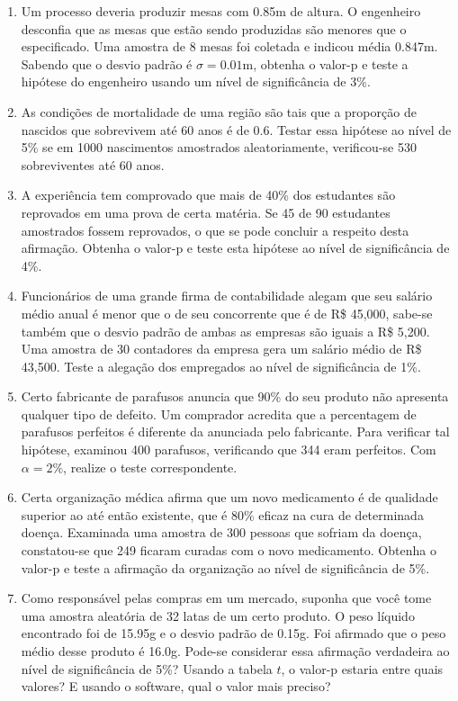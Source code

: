 \documentclass[
]{book}
\theoremstyle{definition}
\theoremstyle{definition}
\theoremstyle{definition}
\theoremstyle{remark}
\begin{document}
\begin{enumerate}
\def\labelenumi{\arabic{enumi}.}
\setcounter{enumi}{1}
\item
  Um processo deveria produzir mesas com 0.85m de altura. O engenheiro desconfia que as mesas que estão sendo produzidas são menores que o especificado. Uma amostra de 8 mesas foi coletada e indicou média 0.847m. Sabendo que o desvio padrão é \(\sigma=0.01\)m, obtenha o valor-p e teste a hipótese do engenheiro usando um nível de significância de 3\%.
\item
  As condições de mortalidade de uma região são tais que a proporção de nascidos que sobrevivem até 60 anos é de 0.6. Testar essa hipótese ao nível de 5\% se em 1000 nascimentos amostrados aleatoriamente, verificou-se 530 sobreviventes até 60 anos.
\item
  A experiência tem comprovado que mais de 40\% dos estudantes são reprovados em uma prova de certa matéria. Se 45 de 90 estudantes amostrados fossem reprovados, o que se pode concluir a respeito desta afirmação. Obtenha o valor-p e teste esta hipótese ao nível de significância de 4\%.
\item
  Funcionários de uma grande firma de contabilidade alegam que seu salário médio anual é menor que o de seu concorrente que é de R\$ 45,000, sabe-se também que o desvio padrão de ambas as empresas são iguais a R\$ 5,200. Uma amostra de 30 contadores da empresa gera um salário médio de R\$ 43,500. Teste a alegação dos empregados ao nível de significância de 1\%.
\item
  Certo fabricante de parafusos anuncia que 90\% do seu produto não apresenta qualquer tipo de defeito. Um comprador acredita que a percentagem de parafusos perfeitos é diferente da anunciada pelo fabricante. Para verificar tal hipótese, examinou 400 parafusos, verificando que 344 eram perfeitos. Com \(\alpha=2\%\), realize o teste correspondente.
\item
  Certa organização médica afirma que um novo medicamento é de qualidade superior ao até então existente, que é 80\% eficaz na cura de determinada doença. Examinada uma amostra de 300 pessoas que sofriam da doença, constatou-se que 249 ficaram curadas com o novo medicamento. Obtenha o valor-p e teste a afirmação da organização ao nível de significância de 5\%.
\item
  Como responsável pelas compras em um mercado, suponha que você tome uma amostra aleatória de 32 latas de um certo produto. O peso líquido encontrado foi de 15.95g e o desvio padrão de 0.15g. Foi afirmado que o peso médio desse produto é 16.0g. Pode-se considerar essa afirmação verdadeira ao nível de significância de 5\%? Usando a tabela \(t\), o valor-p estaria entre quais valores? E usando o software, qual o valor mais preciso?

\end{enumerate}
\end{document}
